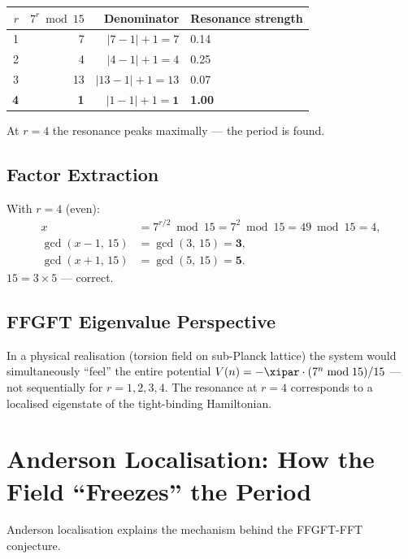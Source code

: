 \begin{center}
{\footnotesize
\begin{tabular}{rrrl}
\toprule
$r$ & $7^r \bmod 15$ & Denominator & Resonance strength \\
\midrule
1 & 7  & $|7-1|+1 = 7$  & 0.14 \\
2 & 4  & $|4-1|+1 = 4$  & 0.25 \\
3 & 13 & $|13-1|+1 = 13$& 0.07 \\
\textbf{4} & \textbf{1}  & $|1-1|+1 = \mathbf{1}$  & \textbf{1.00} \\
\bottomrule
\end{tabular}
} %
\end{center}

At $r = 4$ the resonance peaks maximally ---
the period is found.

\subsection{Factor Extraction}

With $r = 4$ (even):
\begin{align}
  x &= 7^{r/2} \bmod 15 = 7^2 \bmod 15 = 49 \bmod 15 = 4, \\
  \gcd(x-1,\,15) &= \gcd(3,\,15) = \mathbf{3}, \\
  \gcd(x+1,\,15) &= \gcd(5,\,15) = \mathbf{5}.
\end{align}
$15 = 3 \times 5$ --- correct.

\subsection{FFGFT Eigenvalue Perspective}

In a physical realisation
(torsion field on sub-Planck lattice)
the system would simultaneously ``feel'' the entire potential
$V(n) = -\xipar \cdot (7^n \bmod 15)/15$ ---
not sequentially for $r = 1, 2, 3, 4$.
The resonance at $r = 4$ corresponds to a
localised eigenstate of the
tight-binding Hamiltonian.

\section{Anderson Localisation: How the Field ``Freezes'' the Period}
\label{sec:anderson-detail}

Anderson localisation explains the mechanism
behind the FFGFT-FFT conjecture.

